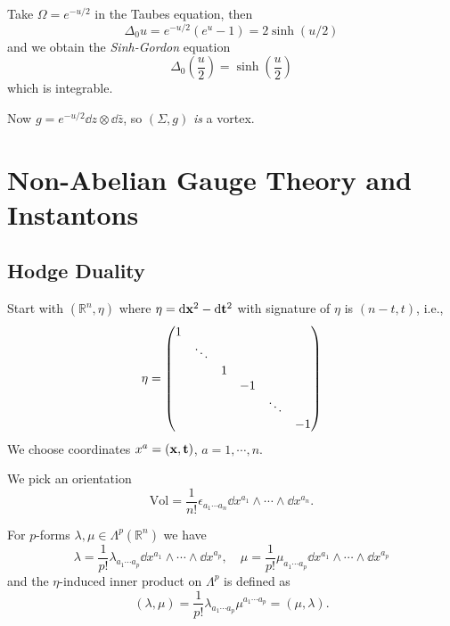 \documentclass[a4paper,11pt]{article}
\begin{document}
    \begin{ex}
        Take $\Omega = e^{-u/2}$ in the Taubes equation, then 
        \begin{equation}
            \Delta_0 u = e^{-u/2}(e^{u} - 1) = 2\sinh(u/2)
        \end{equation}
        and we obtain the \emph{Sinh-Gordon} equation
        \begin{equation}
            \boxed{\Delta_0 \left( \frac{u}{2} \right) = \sinh(\frac{u}{2})}
        \end{equation}
        which is integrable.

        Now $g = e^{-u/2} \dd{z} \otimes \dd{\bar z}$, so $(\Sigma, g)$ \emph{is} a vortex.
    \end{ex} 
    \newpage

    \section{Non-Abelian Gauge Theory and Instantons}
    \subsection{Hodge Duality}
     Start with $(\mathbb{R}^n, \eta)$ where $\eta = \dd{\vb x^2} - \dd{\vb t^2}$ with signature of $\eta$ is $(n-t,t)$, i.e.,
    \begin{equation}
        \eta = \mqty(\dmat{1,\ddots,1,-1,\ddots,-1})
    \end{equation}
    We choose coordinates $x^a = (\vb x, \vb t)$, $a=1,\cdots,n$.
    
    We pick an orientation 
    \begin{equation}
        \text{Vol} = \frac{1}{n!} \epsilon_{a_1 \cdots a_n} \dd{x^{a_1}}\wedge \cdots \wedge \dd{x^{a_n}}.
    \end{equation}
    
    For $p$-forms $\lambda, \mu \in \Lambda^p(\mathbb{R}^n)$ we have 
    \begin{equation}
        \lambda = \frac{1}{p!} \lambda_{a_1 \cdots a_p} \dd{x^{a_1}}\wedge \cdots \wedge \dd{x^{a_p}}, \quad \mu = \frac{1}{p!} \mu_{a_1 \cdots a_p} \dd{x^{a_1}}\wedge \cdots \wedge \dd{x^{a_p}}
    \end{equation}
    and the $\eta$-induced inner product on $\Lambda^p$ is defined as 
    \begin{equation}
        (\lambda, \mu) = \frac{1}{p!} \lambda_{a_1 \cdots a_p} \mu^{a_1 \cdots a_p} = (\mu, \lambda).
    \end{equation}
\end{document}
